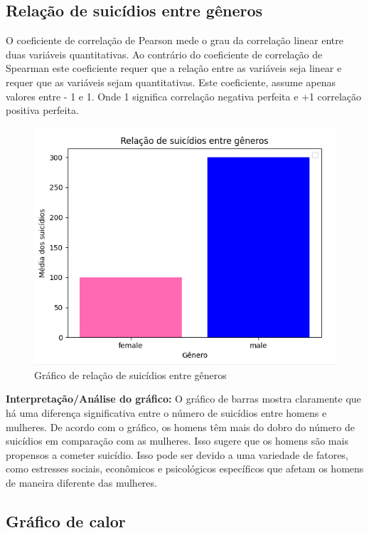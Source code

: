 \documentclass{article}
\begin{document}
\newpage
\subsection{Relação de suicídios entre gêneros}
O coeficiente de correlação de Pearson mede o grau da correlação linear entre duas variáveis quantitativas. Ao contrário do coeficiente de correlação de Spearman este coeficiente requer que a relação entre as variáveis seja linear e requer que as variáveis sejam quantitativas.
\newline
Este coeficiente, assume apenas valores entre - 1 e 1. Onde 1 significa correlação negativa perfeita e +1 correlação positiva perfeita.

\bigskip
\begin{figure}[ht]
    \centering
   \includegraphics[scale=0.8]{graficoB.png}
    \caption{Gráfico de relação de suicídios entre gêneros}
   \label{fig:Grafsuicidgenero}
\end{figure}
 \textbf{Interpretação/Análise do gráfico:}
 \newline
O gráfico de barras mostra claramente que há uma diferença significativa entre o número de suicídios entre homens e mulheres. De acordo com o gráfico, os homens têm mais do dobro do número de suicídios em comparação com as mulheres. Isso sugere que os homens são mais propensos a cometer suicídio. Isso pode ser devido a uma variedade de fatores, como estresses sociais, econômicos e psicológicos específicos que afetam os homens de maneira diferente das mulheres.
\newpage

\subsection{Gráfico de calor}
\end{document}
